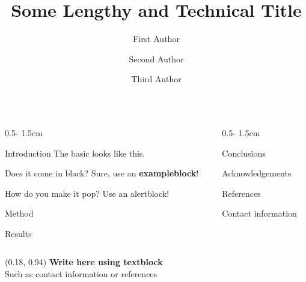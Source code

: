 \documentclass{uioposter}
\title{Some Lengthy and Technical Title}
\author
{%
    First Author\inst{1}
    \and
    Second Author\inst{2}
    \and
    Third Author\inst{1}
}
\institute
{
    \inst{1} Department of Mathematics
    \and
    \inst{2} Department of Informatics
}
\begin{document}
\begin{frame}
\begin{columns}[onlytextwidth]


\begin{column}{0.5\textwidth - 1.5cm}
    \begin{block}{Introduction}
        The basic  looks like this.
    \end{block}

    \begin{exampleblock}{Does it come in black?}
        Sure, use an \textbf{exampleblock}!
    \end{exampleblock}

    \begin{alertblock}{How do you make it pop?}
        Use an \alert{alertblock}!
    \end{alertblock}

    \begin{block}{Method}
        \lipsum[1]
    \end{block}

    \begin{block}{Results}
        \lipsum[2]
        \unskip
    \end{block}
\end{column}


\begin{column}{0.5\textwidth - 1.5cm}
    \begin{block}{Conclusions}
        \lipsum[4]
    \end{block}

    \begin{block}{Acknowledgements}
        \lipsum[5]
    \end{block}

    \begin{block}{References}
        \lipsum[6]
    \end{block}

    \begin{block}{Contact information}
        \lipsum[75]
    \end{block}
\end{column}


\end{columns}


\begin{textblock}{0.5}(0.18, 0.94)
    \color{white}
    \sffamily
    \textbf{Write here using textblock}
    \\
    Such as contact information or references
\end{textblock}


\end{frame}
\end{document}
